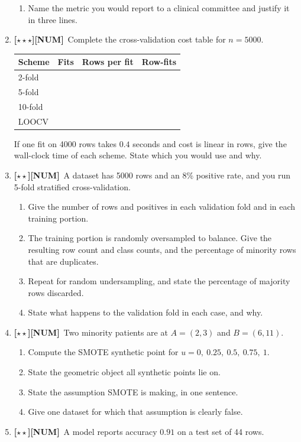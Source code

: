 \documentclass[11pt,a4paper]{article}
\newcommand{\LA}{{\footnotesize\textbf{[$\star\star\star$]}}}
\newcommand{\LB}{{\footnotesize\textbf{[$\star\star$]}}}
\newcommand{\NUM}{{\footnotesize\textbf{[NUM]}}}
\newcommand{\Q}[1]{\item[\textbf{#1}]}
\begin{document}
\begin{enumerate}[leftmargin=2.2cm]
\begin{enumerate}[label=(\alph*)]
    \item Name the metric you would report to a clinical committee and justify
      it in three lines.
  \end{enumerate}
\Q{U4.72}\LA\NUM\ Complete the cross-validation cost table for $n = 5000$.
  \begin{center}\begin{tabular}{@{}lrrr@{}}\toprule
  \textbf{Scheme} & \textbf{Fits} & \textbf{Rows per fit} & \textbf{Row-fits}\\
  \midrule
  2-fold & & & \\ 5-fold & & & \\ 10-fold & & & \\ LOOCV & & & \\
  \bottomrule\end{tabular}\end{center}
  If one fit on 4000 rows takes $0.4$ seconds and cost is linear in rows, give
  the wall-clock time of each scheme. State which you would use and why.
\Q{U4.73}\LB\NUM\ A dataset has 5000 rows and an 8\% positive rate, and you run
  5-fold stratified cross-validation.
  \begin{enumerate}[label=(\alph*)]
    \item Give the number of rows and positives in each validation fold and in
      each training portion.
    \item The training portion is randomly oversampled to balance. Give the
      resulting row count and class counts, and the percentage of minority rows
      that are duplicates.
    \item Repeat for random undersampling, and state the percentage of majority
      rows discarded.
    \item State what happens to the validation fold in each case, and why.
  \end{enumerate}
\Q{U4.74}\LB\NUM\ Two minority patients are at $A = (2,3)$ and $B = (6,11)$.
  \begin{enumerate}[label=(\alph*)]
    \item Compute the SMOTE synthetic point for $u = 0,\ 0.25,\ 0.5,\ 0.75,\ 1$.
    \item State the geometric object all synthetic points lie on.
    \item State the assumption SMOTE is making, in one sentence.
    \item Give one dataset for which that assumption is clearly false.
  \end{enumerate}
\Q{U4.75}\LB\NUM\ A model reports accuracy $0.91$ on a test set of 44 rows.

\end{enumerate}
\end{document}
